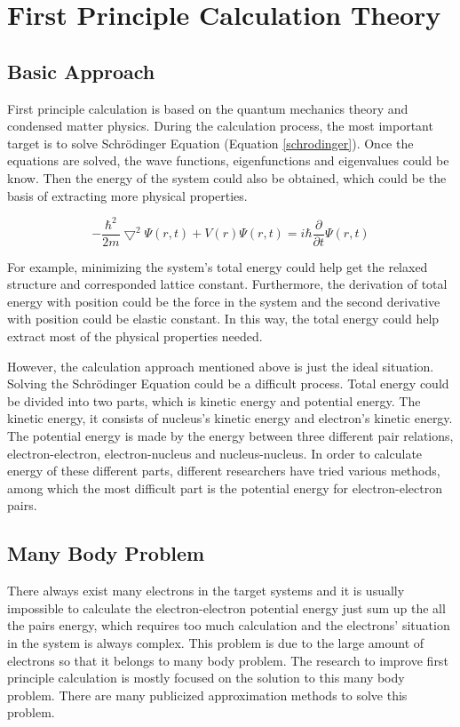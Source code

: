 \documentclass[letterpaper,12pt]{article}
\begin{document}
\section{First Principle Calculation Theory}

\subsection{Basic Approach}

First principle calculation is based on the quantum mechanics theory and condensed matter physics. During the calculation process, the most important target is to solve Schr\"{o}dinger Equation (Equation \ref{schrodinger}). Once the equations are solved, the wave functions, eigenfunctions and eigenvalues could be know. Then the energy of the system could also be obtained, which could be the basis of extracting more physical properties. 

\begin{equation} \label{schrodinger}
-\frac{\hbar^{2}}{2m}\bigtriangledown ^{2}\Psi (r,t)+V(r)\Psi(r,t) = i\hbar \frac{\partial}{\partial t}\Psi(r,t)
\end{equation}

\par For example, minimizing the system's total energy could help get the relaxed structure and corresponded lattice constant. Furthermore, the derivation of total energy with position could be the force in the system and the second derivative with position could be elastic constant. In this way, the total energy could help extract most of the physical properties needed.\\
\par However, the calculation approach mentioned above is just the ideal situation. Solving the Schr\"{o}dinger Equation could be a difficult process. Total energy could be divided into two parts, which is kinetic energy and potential energy. The kinetic energy, it consists of nucleus's kinetic energy and electron's kinetic energy. The potential energy is made by the energy between three different pair relations, electron-electron, electron-nucleus and nucleus-nucleus. In order to calculate energy of these different parts, different researchers have tried various methods, among which the most difficult part is the potential energy for electron-electron pairs.

\subsection{Many Body Problem}
There always exist many electrons in the target systems and it is usually impossible to  calculate the electron-electron potential energy just sum up the all the pairs energy, which requires too much calculation and the electrons' situation in the system is always complex. This problem is due to the large amount of electrons so that it belongs to many body problem\cite{lee1957many}\cite{march1967many}. The research to improve first principle calculation is mostly focused on the solution to this many body problem. There are many publicized approximation methods to solve this problem.
\end{document}
